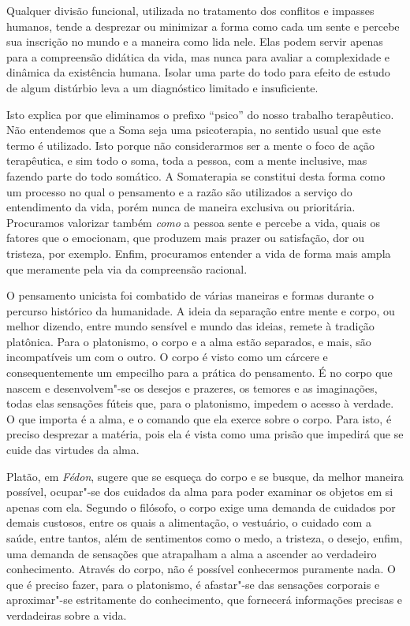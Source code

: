 Qualquer divisão funcional, utilizada no tratamento dos conflitos e
impasses humanos, tende a desprezar ou minimizar a forma como cada um
sente e percebe sua inscrição no mundo e a maneira como lida nele. Elas
podem servir apenas para a compreensão didática da vida, mas nunca para
avaliar a complexidade e dinâmica da existência humana. Isolar uma parte
do todo para efeito de estudo de algum distúrbio leva a um diagnóstico
limitado e insuficiente.

Isto explica por que eliminamos o prefixo ``psico'' do nosso trabalho
terapêutico. Não entendemos que a Soma seja uma psicoterapia, no sentido
usual que este termo é utilizado. Isto porque não considerarmos ser
a mente o foco de ação terapêutica, e sim todo o soma, toda a pessoa,
com a mente inclusive, mas fazendo parte do todo somático. A Somaterapia
se constitui desta forma como um processo no qual o pensamento e a razão
são utilizados a serviço do entendimento da vida, porém nunca de maneira
exclusiva ou prioritária. Procuramos valorizar também \emph{como} a
pessoa sente e percebe a vida, quais os fatores que o emocionam, que
produzem mais prazer ou satisfação, dor ou tristeza, por exemplo.
Enfim, procuramos entender a vida de forma mais ampla que meramente pela
via da compreensão racional.

O pensamento unicista foi combatido de várias maneiras e formas durante
o percurso histórico da humanidade. A ideia da separação entre mente e
corpo, ou melhor dizendo, entre mundo sensível e mundo das ideias,
remete à tradição platônica. Para o platonismo, o corpo e a alma estão
separados, e mais, são incompatíveis um com o outro. O corpo é visto
como um cárcere e consequentemente um empecilho para a prática do
pensamento. É no corpo que nascem e desenvolvem"-se os desejos e
prazeres, os temores e as imaginações, todas elas sensações fúteis que,
para o platonismo, impedem o acesso à verdade. O que importa é a alma, e
o comando que ela exerce sobre o corpo. Para isto, é preciso desprezar a
matéria, pois ela é vista como uma prisão que impedirá que se cuide das
virtudes da alma.

Platão, em \emph{Fédon}, sugere que se esqueça do corpo e se busque, da
melhor maneira possível, ocupar"-se dos cuidados da alma para poder
examinar os objetos em si apenas com ela. Segundo o filósofo, o corpo
exige uma demanda de cuidados por demais custosos, entre os quais a
alimentação, o vestuário, o cuidado com a saúde, entre tantos, além de
sentimentos como o medo, a tristeza, o desejo, enfim, uma demanda de
sensações que atrapalham a alma a ascender ao verdadeiro conhecimento.
Através do corpo, não é possível conhecermos puramente nada. O que é
preciso fazer, para o platonismo, é afastar"-se das sensações
corporais e aproximar"-se estritamente do conhecimento, que %
fornecerá informações precisas e verdadeiras sobre a vida.

